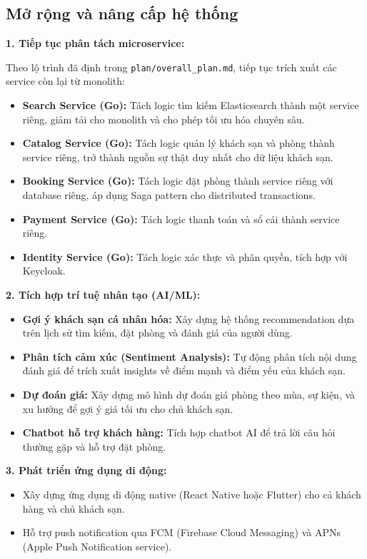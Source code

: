 \documentclass[13pt,a4paper,twoside]{report}
\begin{document}
\subsection{Mở rộng và nâng cấp hệ thống}

\textbf{1. Tiếp tục phân tách microservice:}

Theo lộ trình đã định trong \texttt{plan/overall\_plan.md}, tiếp tục trích xuất các service còn lại từ monolith:

\begin{itemize}
  \item \textbf{Search Service (Go):} Tách logic tìm kiếm Elasticsearch thành một service riêng, giảm tải cho monolith và cho phép tối ưu hóa chuyên sâu.
  \item \textbf{Catalog Service (Go):} Tách logic quản lý khách sạn và phòng thành service riêng, trở thành nguồn sự thật duy nhất cho dữ liệu khách sạn.
  \item \textbf{Booking Service (Go):} Tách logic đặt phòng thành service riêng với database riêng, áp dụng Saga pattern cho distributed transactions.
  \item \textbf{Payment Service (Go):} Tách logic thanh toán và sổ cái thành service riêng.
  \item \textbf{Identity Service (Go):} Tách logic xác thực và phân quyền, tích hợp với Keycloak.
\end{itemize}

\textbf{2. Tích hợp trí tuệ nhân tạo (AI/ML):}

\begin{itemize}
  \item \textbf{Gợi ý khách sạn cá nhân hóa:} Xây dựng hệ thống recommendation dựa trên lịch sử tìm kiếm, đặt phòng và đánh giá của người dùng.
  \item \textbf{Phân tích cảm xúc (Sentiment Analysis):} Tự động phân tích nội dung đánh giá để trích xuất insights về điểm mạnh và điểm yếu của khách sạn.
  \item \textbf{Dự đoán giá:} Xây dựng mô hình dự đoán giá phòng theo mùa, sự kiện, và xu hướng để gợi ý giá tối ưu cho chủ khách sạn.
  \item \textbf{Chatbot hỗ trợ khách hàng:} Tích hợp chatbot AI để trả lời câu hỏi thường gặp và hỗ trợ đặt phòng.
\end{itemize}

\textbf{3. Phát triển ứng dụng di động:}

\begin{itemize}
  \item Xây dựng ứng dụng di động native (React Native hoặc Flutter) cho cả khách hàng và chủ khách sạn.
  \item Hỗ trợ push notification qua FCM (Firebase Cloud Messaging) và APNs (Apple Push Notification service).
\end{itemize}
\end{document}
